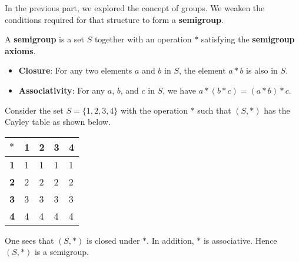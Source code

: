 In the previous part, we explored the concept of groups. We weaken the conditions required for that structure to form a \textbf{semigroup}.
\begin{definition}
    A \textbf{semigroup} is a set $S$ together with an operation $\ast$ satisfying the \textbf{semigroup axioms}.
    \begin{itemize}
        \item \textbf{Closure}: For any two elements $a$ and $b$ in $S$, the element $a\ast b$ is also in $S$.
        \item \textbf{Associativity}: For any $a$, $b$, and $c$ in $S$, we have $a \ast (b \ast c) = (a \ast b) \ast c$.
    \end{itemize}
\end{definition}
\begin{example}
    Consider the set $S = \{1, 2, 3, 4\}$ with the operation $\ast$ such that $(S, \ast)$ has the Cayley table as shown below.
    \begin{table}[h]
        \centering
        \begin{tabular}{|l|l|l|l|l|}
            \hline
            $\ast$     & \textbf{1} & \textbf{2} & \textbf{3} & \textbf{4} \\ \hline
            \textbf{1} & 1          & 1          & 1          & 1          \\ \hline
            \textbf{2} & 2          & 2          & 2          & 2          \\ \hline
            \textbf{3} & 3          & 3          & 3          & 3          \\ \hline
            \textbf{4} & 4          & 4          & 4          & 4          \\ \hline
        \end{tabular}
    \end{table}

    One sees that $(S, \ast)$ is closed under $\ast$. In addition, $\ast$ is associative. Hence $(S, \ast)$ is a semigroup.
\end{example}

